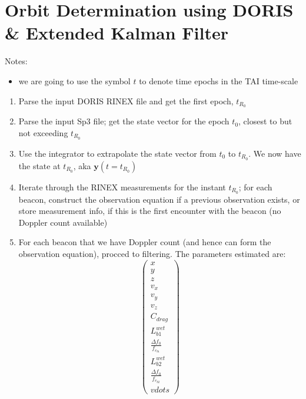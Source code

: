 \chapter{Orbit Determination using DORIS \& Extended Kalman Filter}

Notes:
\begin{itemize}
  \item we are going to use the symbol $t$ to denote time epochs in the 
    TAI time-scale
\end{itemize}

\begin{enumerate}
  \item Parse the input DORIS RINEX file and get the first epoch, $t_{R_0}$

  \item Parse the input Sp3 file; get the state vector for the epoch $t_0$, 
    closest to but not exceeding $t_{R_0}$

  \item Use the integrator to extrapolate the state vector from $t_0$ to 
    $t_{R_0}$. We now have the state at $t_{R_0}$, aka $\bm{y}(t=t_{R_0})$

  \item Iterate through the RINEX measurements for the instant $t_{R_0}$; 
    for each beacon, construct the observation equation if a previous 
    observation exists, or store measurement info, if this is the first 
    encounter with the beacon (no Doppler count available)

  \item For each beacon that we have Doppler count (and hence can form the 
    observation equation), procced to filtering. The parameters estimated are:
    \begin{equation}
      \begin{pmatrix} x \\ y \\ z \\ 
        v_x \\ v_y \\ v_z 
        \\ C_{drag}
        \\ L_{b1}^{wet} \\ \frac{\Delta f_0}{f_{e_{b1}}}
        \\ L_{b2}^{wet} \\ \frac{\Delta f_0}{f_{e_{b2}}}
        \\ vdots 
      \end{pmatrix}
    \end{equation}

\end{enumerate}
